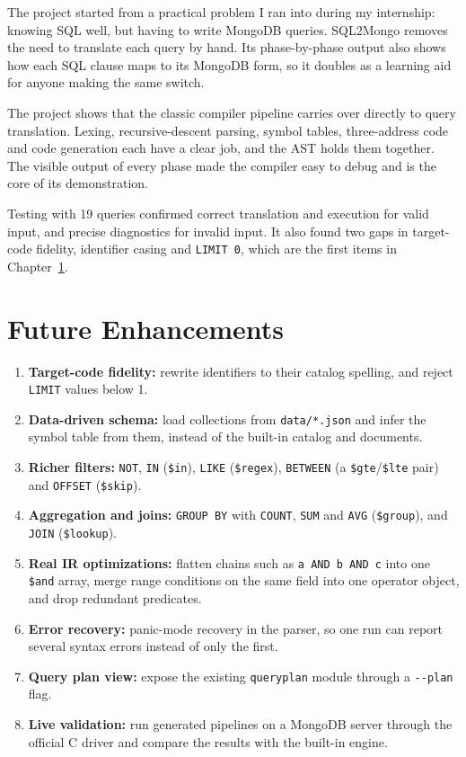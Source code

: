 \documentclass[12pt,a4paper]{report}
\newcommand{\codeus}{\textunderscore\allowbreak}
\DeclareRobustCommand{\code}[1]{\texttt{\let\_\codeus #1}}
\begin{document}
The project started from a practical problem I ran into during my internship: knowing SQL well, but having to write MongoDB queries. SQL2Mongo removes the need to translate each query by hand. Its phase-by-phase output also shows how each SQL clause maps to its MongoDB form, so it doubles as a learning aid for anyone making the same switch.

The project shows that the classic compiler pipeline carries over directly to query translation. Lexing, recursive-descent parsing, symbol tables, three-address code and code generation each have a clear job, and the AST holds them together. The visible output of every phase made the compiler easy to debug and is the core of its demonstration.

Testing with 19 queries confirmed correct translation and execution for valid input, and precise diagnostics for invalid input. It also found two gaps in target-code fidelity, identifier casing and \code{LIMIT 0}, which are the first items in Chapter~\ref{ch:future}.

\chapter{Future Enhancements}\label{ch:future}
\begin{enumerate}
  \item \textbf{Target-code fidelity:} rewrite identifiers to their catalog spelling, and reject \code{LIMIT} values below 1.
  \item \textbf{Data-driven schema:} load collections from \code{data/*.json} and infer the symbol table from them, instead of the built-in catalog and documents.
  \item \textbf{Richer filters:} \code{NOT}, \code{IN} (\code{\$in}), \code{LIKE} (\code{\$regex}), \code{BETWEEN} (a \code{\$gte}/\code{\$lte} pair) and \code{OFFSET} (\code{\$skip}).
  \item \textbf{Aggregation and joins:} \code{GROUP BY} with \code{COUNT}, \code{SUM} and \code{AVG} (\code{\$group}), and \code{JOIN} (\code{\$lookup}).
  \item \textbf{Real IR optimizations:} flatten chains such as \code{a AND b AND c} into one \code{\$and} array, merge range conditions on the same field into one operator object, and drop redundant predicates.
  \item \textbf{Error recovery:} panic-mode recovery in the parser, so one run can report several syntax errors instead of only the first.
  \item \textbf{Query plan view:} expose the existing \code{query\_plan} module through a \code{-{}-plan} flag.
  \item \textbf{Live validation:} run generated pipelines on a MongoDB server through the official C driver and compare the results with the built-in engine.
\end{enumerate}
\end{document}
